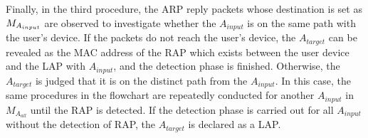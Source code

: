 \documentclass[conference]{IEEEtran}
\newcommand{\inputAP}{A_{input}}
\newcommand{\tarAP}{A_{target}}
\begin{document}
Finally, in the third procedure, the ARP reply packets whose destination is set as $M_{A_{input}}$ are observed to investigate whether the $\inputAP$ is on the same path with the user's device.
If the packets do not reach the user's device, the $\tarAP$ can be revealed as the MAC address of the RAP which exists between the user device and the LAP with  $\inputAP$, and the detection phase is finished.
Otherwise, the $\tarAP$ is judged that it is on the distinct path from the $\inputAP$.
In this case, the same procedures in the flowchart are repeatedly conducted for another $\inputAP$ in $M_{A_{all}}$ until the RAP is detected.
If the detection phase is carried out for all $\inputAP$ without the detection of RAP, the $\tarAP$ is declared as a LAP. 
\end{document}
